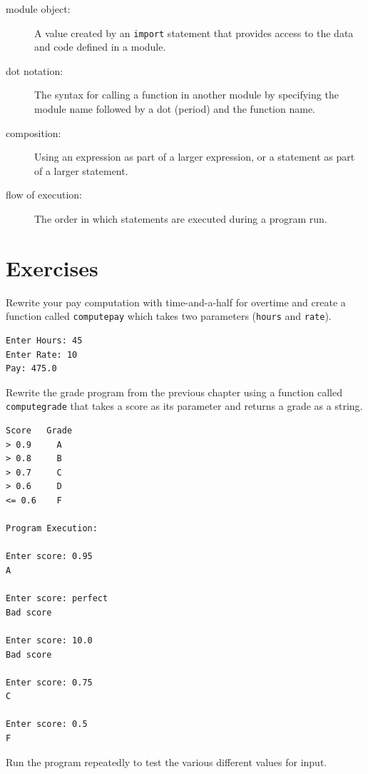 \documentclass[10pt]{book}
\begin{document}
\begin{description}
\item[module object:] A value created by an {\tt import} statement
that provides access to the data and code defined in a module.

\item[dot notation:]  The syntax for calling a function in another
module by specifying the module name followed by a dot (period) and
the function name.

\item[composition:] Using an expression as part of a larger expression,
or a statement as part of a larger statement.

\item[flow of execution:]  The order in which statements are executed during
a program run.


\end{description}


\section{Exercises}

\begin{ex}
Rewrite your pay computation with time-and-a-half for overtime
and create a function called {\tt computepay} which takes
two parameters ({\tt hours} and {\tt rate}).

\begin{verbatim}
Enter Hours: 45
Enter Rate: 10
Pay: 475.0
\end{verbatim}
\end{ex}

\begin{ex}
Rewrite the grade program from the previous chapter 
using a function called {\tt computegrade} that takes
a score as its parameter and returns a grade as a string.

\begin{verbatim}
Score   Grade
> 0.9     A
> 0.8     B
> 0.7     C
> 0.6     D
<= 0.6    F

Program Execution:

Enter score: 0.95
A

Enter score: perfect
Bad score

Enter score: 10.0
Bad score

Enter score: 0.75
C

Enter score: 0.5
F
\end{verbatim}

Run the program repeatedly to test the various different values
for input.
\end{ex}
\end{document}
